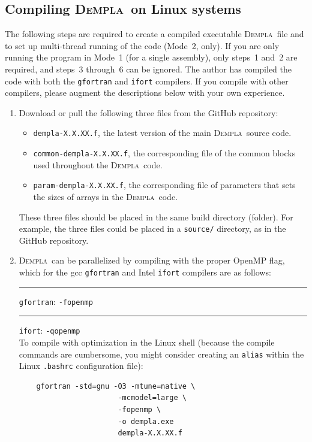 \documentclass[letterpaper,11pt]{article}
\newcommand{\Dempla}{\textsc{Dempla}}
\begin{document}
\subsection{Compiling \Dempla\ on Linux systems}\label{sec:UnixSystems}
%
The following steps are required
to create a compiled executable \Dempla\ file and to set up
multi-thread running of the code (Mode~2, only).
If you are only running the program in Mode~1
(for a single assembly), only steps~1 and~2 are required,
and steps~3 through~6 can be ignored.
The author has compiled the code with both the \texttt{gfortran}
and \texttt{ifort} compilers.
If you compile with other compilers, please augment the descriptions
below with your own experience.
%
\begin{enumerate}
\item
Download or pull the following three files from the GitHub
repository:
  \begin{itemize}
  	\item
  	  \texttt{dempla-X.X.XX.f}, the latest version of the 
  	  main \Dempla\ source code.
  	\item
  	  \texttt{common-dempla-X.X.XX.f}, the corresponding file of
  	  the common blocks used throughout the \Dempla\ code.
  	\item
  	  \texttt{param-dempla-X.X.XX.f}, the corresponding file of
  	  parameters that sets the sizes of arrays in the \Dempla\ code.
  \end{itemize}
These three files should be placed in the same build
directory (folder).
For example, the three files could be placed in a 
\texttt{source/} directory, as in the GitHub repository.
%
\item\label{item:compile}
\Dempla\ can be parallelized by compiling with the proper OpenMP flag,
which for the gcc \texttt{gfortran} and Intel \texttt{ifort} compilers
are as follows:\\
\rule{3ex}{0ex} \texttt{gfortran}: \texttt{-fopenmp}\\
\rule{3ex}{0ex} \texttt{ifort}:    \texttt{-qopenmp}\\
To compile with optimization in the Linux shell
(because the compile commands are cumbersome,
you might consider creating an \texttt{alias} within
the Linux \texttt{.bashrc} configuration file):
\begin{verbatim}
    gfortran -std=gnu -O3 -mtune=native \
                       -mcmodel=large \
                       -fopenmp \
                       -o dempla.exe
                       dempla-X.X.XX.f
\end{verbatim}

\end{enumerate}
\end{document}
